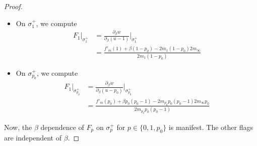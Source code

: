 \documentclass[10pt,a4paper]{amsart}
\def\mathbf#1{#1}%
\begin{document}
\begin{proof}
\begin{itemize}
Evaluated on $\sigma^+_0$ ($u=0$, $w=m_0 p_0$), this gives 
\[ 0 = \left( f'_{\mathbf{m}}(0)  + \beta p_0 \right)\partial_\beta u    - 2 (m_0p_0)\partial_\beta w. \]
   \item On $\sigma^+_1$,
   we compute 
   \begin{align*}
F_1\Big|_{\sigma^+_1} &= 
\frac{\partial_\beta w}{\partial_\beta (u-1)} \Big|_{\sigma^+_1}\\  
&=  \frac{f'_{\mathbf{m}}(1) + \beta(1-p_0)- 2 m_1(1-p_0) 2 m_\infty}{2m_1(1-p_0)} 
 \end{align*}
   \item On $\sigma^+_{p_0}$, we compute
      \begin{align*}
F_1\Big|_{\sigma^+_{p_0}} &= 
\frac{\partial_\beta w}{\partial_\beta (u-p_0)} \Big|_{\sigma^+_{p_0}}\\  
&=  \frac{f'_{\mathbf{m}}(p_0) + \beta p_0(p_0-1)- 2 m_{p_0} p_0(p_0-1)2 m_\infty p_0}{2 m_{p_0} p_0(p_0-1)} 
 \end{align*}
   \end{itemize}
   Now, the $\beta$ dependence of $F_{p}$ on $\sigma^+_p$ for $p \in \{0, 1, p_0\}$ is manifest. The other flags are independent of $\beta$.
   

\end{proof}
\end{document}
